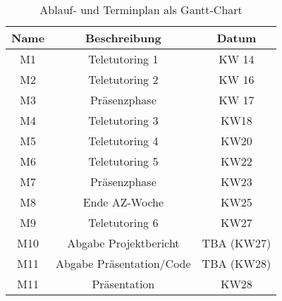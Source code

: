 \documentclass[12pt,titlepage]{article}
\begin{document}
 
 \begin{table}[h]
    \centering
    \begin{tabular}{|c || c c|} 
        \hline
        Name     & Beschreibung     & Datum     \\ 
        \hline \hline
        M1         & Teletutoring 1        & KW 14         \\ 
        M2 & Teletutoring 2	& KW 16\\ 
M3 & Präsenzphase	& KW 17\\ 
M4 & Teletutoring 3	& KW18\\ 
M5 &Teletutoring 4	&KW20\\ 
M6 &Teletutoring 5	&KW22\\ 
M7 &Präsenzphase	&KW23\\
M8 &Ende AZ-Woche	&KW25\\
M9 &Teletutoring 6	&KW27\\ 
M10 &Abgabe Projektbericht	&TBA (KW27)\\ 
M11 &Abgabe Präsentation/Code	&TBA (KW28)\\ 
M11 &Präsentation	& KW28\\ \hline
    \end{tabular}
    
    \caption{Ablauf- und Terminplan als Gantt-Chart}
    
    \label{tab:milestones}
\end{table}


\newpage
\printbibliography 
\end{document}
